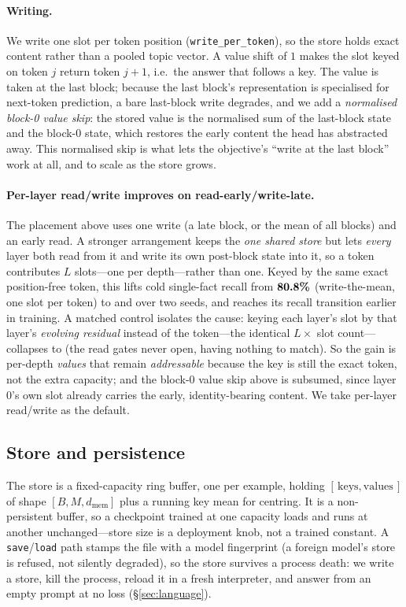 \paragraph{Writing.} We write one slot per token position (\texttt{write\_per\_token}),
so the store holds exact content rather than a pooled topic vector. A value shift
of $1$ makes the slot keyed on token $j$ return token $j\!+\!1$, i.e.\ the answer
that follows a key. The value is taken at the last block; because the last block's
representation is specialised for next-token prediction, a bare last-block write
degrades, and we add a \emph{normalised block-0 value skip}: the stored value is
the normalised sum of the last-block state and the block-0 state, which restores
the early content the head has abstracted away. This normalised skip is what lets
the objective's ``write at the last block'' work at all, and to scale as the store
grows.

\paragraph{Per-layer read/write improves on read-early/write-late.} The placement
above uses one write (a late block, or the mean of all blocks) and an early read. A
stronger arrangement keeps the \emph{one shared store} but lets \emph{every} layer
both read from it and write its own post-block state into it, so a token contributes
$L$ slots---one per depth---rather than one. Keyed by the same exact position-free
token, this lifts cold single-fact recall from $\textbf{80.8\%}$ (write-the-mean, one
slot per token) to  and  over two seeds, and reaches its
recall transition earlier in training. A matched control isolates the cause: keying
each layer's slot by that layer's \emph{evolving residual} instead of the token---the
identical $L\times$ slot count---collapses to  (the read gates never open,
having nothing to match). So the gain is per-depth \emph{values} that remain
\emph{addressable} because the key is still the exact token, not the extra capacity;
and the block-0 value skip above is subsumed, since layer $0$'s own slot already
carries the early, identity-bearing content. We take per-layer read/write as the
default.

\subsection{Store and persistence}

The store is a fixed-capacity ring buffer, one per example, holding
$[\,\text{keys},\text{values}\,]$ of shape $[B,M,d_\text{mem}]$ plus a running key
mean for centring. It is a non-persistent buffer, so a checkpoint trained at one
capacity loads and runs at another unchanged---store size is a deployment knob,
not a trained constant. A \texttt{save}/\texttt{load} path stamps the file with a
model fingerprint (a foreign model's store is refused, not silently degraded), so
the store survives a process death: we write a store, kill the process, reload it
in a fresh interpreter, and answer from an empty prompt at no loss
(\S\ref{sec:language}).

